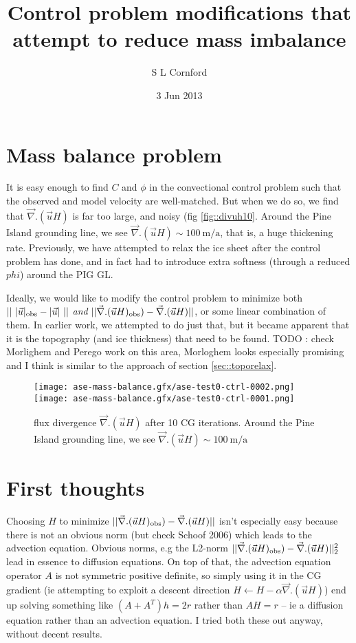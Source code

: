 \documentclass{article}
\title{Control problem modifications that attempt to reduce mass imbalance}
\author{S L Cornford}
\date{3 Jun 2013}\newcommand{\usrf}{s}
\begin{document}
\pagestyle{plain}
\maketitle
\tableofcontents

\section{Mass balance problem}

It is easy enough to find $C$ and $\phi$ in the convectional control problem such that the
observed and model velocity are well-matched. But when we do so, we find that $\vec{\nabla}. (\vec{u} H)$
is far too large, and noisy (fig \ref{fig::divuh10}. Around the Pine Island grounding line, we see $\vec{\nabla}. (\vec{u} H) \sim 100~\mbox{m/a}$,
that is, a huge thickening rate. Previously, we have attempted to relax the ice sheet after the control problem has done, and in fact had to
introduce extra softness (through a reduced $phi$) around the PIG GL.  

Ideally, we would like to modify the control problem to minimize both $||~|\vec{u}|_{\rm obs} - |\vec{u}|~||$ 
\emph{and} $||\vec{\nabla}. (\vec{u} H)_{\rm obs}) - \vec{\nabla}. (\vec{u} H)  ||$, or some linear combination
of them. In earlier work, we attempted to do just that, but it became apparent that it is the topography 
(and ice thickness) that need to be found. TODO : check Morlighem and Perego work on this area, Morloghem 
looks especially promising and I think is similar to the approach of section \ref{sec::toporelax}.

\begin{figure}
\begin{center}
\texttt{[image: ase-mass-balance.gfx/ase-test0-ctrl-0002.png]}
\texttt{[image: ase-mass-balance.gfx/ase-test0-ctrl-0001.png]}
\end{center}
\caption{\protect{\label{fig::divuh10}}} flux divergence $\vec{\nabla}. (\vec{u} H)$
after 10 CG iterations. Around the Pine Island grounding line, we see $\vec{\nabla}. (\vec{u} H) \sim 100~\mbox{m/a}$
\end{figure}

\section{First thoughts}

Choosing $H$ to minimize  $||\vec{\nabla}. (\vec{u} H)_{\rm obs}) - \vec{\nabla}. (\vec{u} H)  ||$ isn't
especially easy because there is not an obvious norm (but check Schoof 2006) which leads to the
advection equation. Obvious norms, e.g the L2-norm $||\vec{\nabla}. (\vec{u} H)_{\rm obs}) - \vec{\nabla}. (\vec{u} H)  ||^2_2$ lead 
in essence to diffusion equations. On top of that, the advection equation operator $A$ is not symmetric positive definite,
so simply using it in the CG gradient (ie attempting to exploit a descent direction $H \leftarrow H - \alpha  \vec{\nabla}. (\vec{u} H)$)
end up solving something like $ (A + A^T)h = 2 r$ rather than $ A H = r$ -- ie a diffusion equation rather than an advection equation.
I tried both these out anyway, without decent results.
\end{document}
